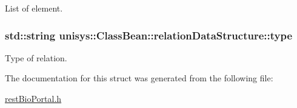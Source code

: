 List of element. 

\hypertarget{structunisys_1_1ClassBean_1_1relationDataStructure_a4110e88e6d07e6067637713c20304db8}{
\subsubsection[{type}]{\setlength{\rightskip}{0pt plus 5cm}std\-::string unisys\-::\-Class\-Bean\-::relation\-Data\-Structure\-::type}}\label{structunisys_1_1ClassBean_1_1relationDataStructure_a4110e88e6d07e6067637713c20304db8}


Type of relation. 



The documentation for this struct was generated from the following file\-:\begin{DoxyCompactItemize}
\item 
\hyperlink{restBioPortal_8h}{rest\-Bio\-Portal.\-h}\end{DoxyCompactItemize}
